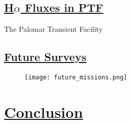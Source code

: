 \documentclass[12pt]{article} %
\numberwithin{equation}{section} %
\begin{document}
\subsection[H$\alpha$ Fluxes in PTF]{\hyperlink{toc}{H$\alpha$ Fluxes in PTF}}

The Palomar Transient Facility

\subsection[Future Surveys]{\hyperlink{toc}{Future Surveys}}

\begin{figure}[H]
\centering
\texttt{[image: future\_missions.png]}
\caption{}
\label{fig: future_missions}
\end{figure}





\section[Conclusion]{\hyperlink{toc}{Conclusion}}


\appendix


\newpage

\printindex



\end{document}
